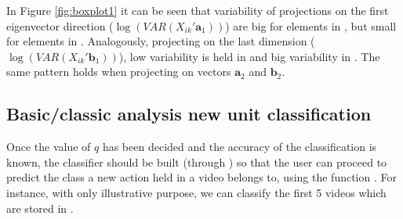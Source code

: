 In Figure \ref{fig:boxplot1} it can be seen that variability of projections on the first eigenvector direction ($\log(VAR(X_{i k}'\mathbf{a}_1))$) are big for elements in , but small for elements in .  Analogously, projecting on the last dimension ($\log(VAR(X_{i k}'\mathbf{b}_1))$), low variability is held in  and big variability in . The same pattern holds when projecting on vectors $\mathbf{a}_2$ and $\mathbf{b}_2$.\\









\subsection{Basic/classic analysis new unit classification}

Once the value of $q$ has been decided and the accuracy of the classification is known, the classifier should be built (through ) so that the user can proceed to predict the class a new action  held in a video belongs to, using the function . For instance, with only illustrative purpose, we can classify the first 5 videos which are stored in . 

